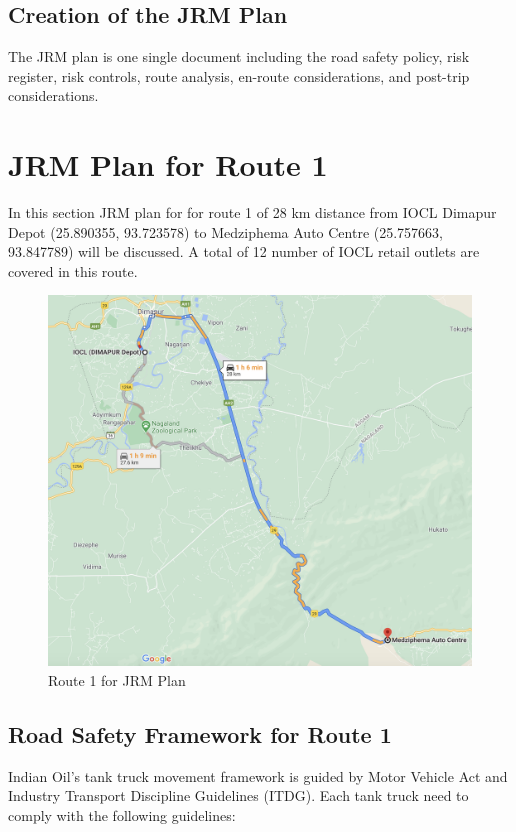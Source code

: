 \documentclass[paper=letter, fontsize=12pt]{article}
\begin{document}
\subsection{Creation of the JRM Plan}

The JRM plan is one single document including the road safety policy, risk register, risk controls, route analysis, en-route considerations, and post-trip considerations.

\section{JRM Plan for Route 1}

In this section JRM plan for for route 1 of 28 km distance from IOCL Dimapur Depot (25.890355, 93.723578) to Medziphema Auto Centre (25.757663, 93.847789) will be discussed.
A total of 12 number of IOCL retail outlets are covered in this route.
 \begin{figure}[htpb]
    \centering
    \includegraphics[scale = 0.4]{route1}
    \caption{Route 1 for JRM Plan}
    \label{route1}
\end{figure}

\subsection{Road Safety Framework for Route 1}

Indian Oil's tank truck movement framework is guided by Motor Vehicle Act and Industry Transport Discipline Guidelines (ITDG). Each tank truck need to comply with the following guidelines:
\end{document}
